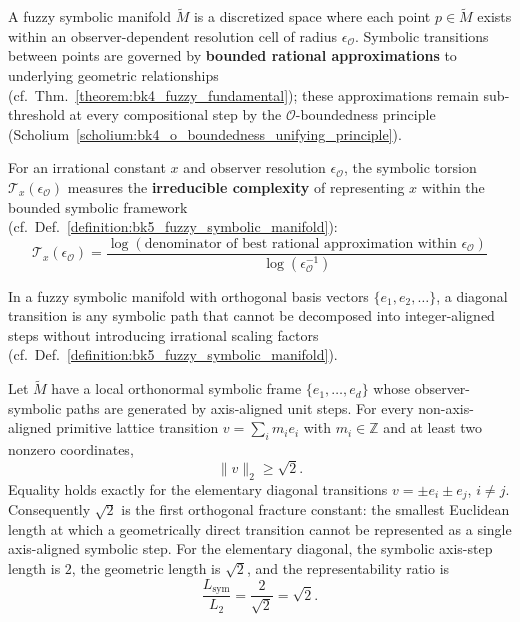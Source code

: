 \begin{definition}
\label{definition:bk5_fuzzy_symbolic_manifold}
A fuzzy symbolic manifold $\tilde{M}$ is a discretized space where each point $p \in \tilde{M}$ exists within an observer-dependent resolution cell of radius $\epsilon_\mathcal{O}$. Symbolic transitions between points are governed by \textbf{bounded rational approximations} to underlying geometric relationships (cf.~Thm.~\ref{theorem:bk4_fuzzy_fundamental}); these approximations remain sub-threshold at every compositional step by the $\mathcal{O}$-boundedness principle (Scholium~\ref{scholium:bk4_o_boundedness_unifying_principle}).
\end{definition}

\begin{definition}
\label{definition:bk5_symbolic_torsion}
For an irrational constant $x$ and observer resolution $\epsilon_\mathcal{O}$, the symbolic torsion $\mathcal{T}_x(\epsilon_\mathcal{O})$ measures the \textbf{irreducible complexity} of representing $x$ within the bounded symbolic framework (cf.~Def.~\ref{definition:bk5_fuzzy_symbolic_manifold}):
$$\mathcal{T}_x(\epsilon_\mathcal{O}) = \frac{\log(\text{denominator of best rational approximation within } \epsilon_\mathcal{O})}{\log(\epsilon_\mathcal{O}^{-1})}$$
\end{definition}

\begin{definition}
\label{definition:bk5_diagonal_transition}
In a fuzzy symbolic manifold with orthogonal basis vectors $\{e_1, e_2, \ldots\}$, a diagonal transition is any symbolic path that cannot be decomposed into integer-aligned steps without introducing irrational scaling factors (cf.~Def.~\ref{definition:bk5_fuzzy_symbolic_manifold}).
\end{definition}

\begin{theorem}
\label{theorem:bk5_sqrt2_maximal_fracture}
Let $\tilde{M}$ have a local orthonormal symbolic frame
$\{e_1,\ldots,e_d\}$ whose observer-symbolic paths are generated by
axis-aligned unit steps.  For every non-axis-aligned primitive lattice
transition $v=\sum_i m_i e_i$ with $m_i\in\mathbb{Z}$ and at least two nonzero
coordinates,
\[
\|v\|_2\geq \sqrt{2}.
\]
Equality holds exactly for the elementary diagonal transitions
$v=\pm e_i\pm e_j$, $i\neq j$.  Consequently $\sqrt{2}$ is the first
orthogonal fracture constant: the smallest Euclidean length at which a
geometrically direct transition cannot be represented as a single
axis-aligned symbolic step.  For the elementary diagonal, the symbolic
axis-step length is $2$, the geometric length is $\sqrt{2}$, and the
representability ratio is
\[
\frac{L_{\mathrm{sym}}}{L_2}=\frac{2}{\sqrt{2}}=\sqrt{2}.
\]
\end{theorem}


